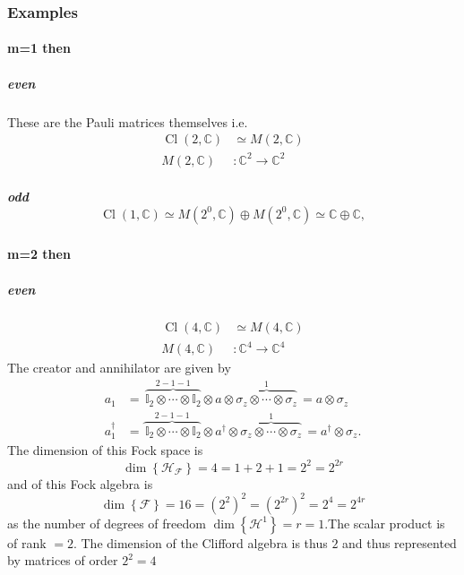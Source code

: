 \documentclass[aps,preprint]{revtex4}%
\begin{document}
\subsubsection{Examples}

\paragraph{m=1 then}

\subparagraph{ even}

These are the Pauli matrices themselves i.e.%
\begin{align}
\operatorname*{Cl}\left(  2,\mathbb{C}\right)   &  \simeq M\left(
2,\mathbb{C}\right) \\
M\left(  2,\mathbb{C}\right)   &  :\mathbb{C}^{2}\rightarrow\mathbb{C}^{2}%
\end{align}


\subparagraph{odd%
\begin{equation}
\operatorname*{Cl}\left(  1,\mathbb{C}\right)  \simeq M\left(  2^{0}%
,\mathbb{C}\right)  \oplus M\left(  2^{0},\mathbb{C}\right)  \simeq
\mathbb{C}\oplus\mathbb{C},
\end{equation}
}

\paragraph{m=2 then}

\subparagraph{even}%

\begin{align}
\operatorname*{Cl}\left(  4,\mathbb{C}\right)   &  \simeq M\left(
4,\mathbb{C}\right) \\
M\left(  4,\mathbb{C}\right)   &  :\mathbb{C}^{4}\rightarrow\mathbb{C}^{4}%
\end{align}
The creator and annihilator are given by
\begin{align}
a_{1}  &  =\,\overset{2-1-1}{\overbrace{\mathbb{I}_{2}\otimes\cdots
\otimes\mathbb{I}_{2}}}\otimes a\otimes\overset{1}{\overbrace{\mathbb{\sigma
}_{z}\otimes\cdots\otimes\mathbb{\sigma}_{z}}}\,=a\otimes\mathbb{\sigma}_{z}\\
a_{1}^{\dagger}  &  =\overset{2-1-1}{\overbrace{\,\mathbb{I}_{2}\otimes
\cdots\otimes\mathbb{I}_{2}}}\otimes a^{\dagger}\otimes
\overset{1}{\overbrace{\mathbb{\sigma}_{z}\otimes\cdots\otimes\mathbb{\sigma
}_{z}}}\,=a^{\dagger}\otimes\mathbb{\sigma}_{z}.
\end{align}
The dimension of this Fock space is
\begin{equation}
\dim\left\{  \mathcal{H}_{\mathcal{F}}\right\}  =4=1+2+1=2^{2}=2^{2r}%
\end{equation}
and of this Fock algebra is
\begin{equation}
\dim\left\{  \mathcal{F}\right\}  =16=\left(  2^{2}\right)  ^{2}=\left(
2^{2r}\right)  ^{2}=2^{4}=2^{4r}%
\end{equation}
as the number of degrees of freedom $\dim\left\{  \mathcal{H}^{1}\right\}
=r=1.$The scalar product is of rank $=2$. The dimension of the Clifford
algebra is thus $2$ and thus represented by matrices of order $2^{2}=4$
\end{document}
